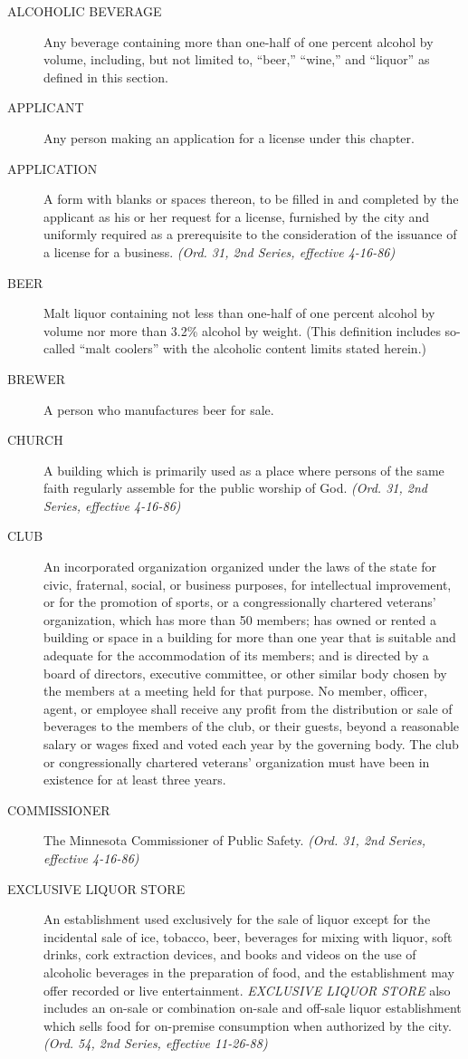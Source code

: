 \begin{description}
    \item[ALCOHOLIC BEVERAGE] Any beverage containing more than one-half of one percent alcohol by volume, including, but not limited to, “beer,” “wine,” and “liquor” as defined in this section.
    \item[APPLICANT] Any person making an application for a license under this chapter.
    \item[APPLICATION] A form with blanks or spaces thereon, to be filled in and completed by the applicant as his or her request for a license, furnished by the city and uniformly required as a prerequisite to the consideration of the issuance of a license for a business. \emph{(Ord. 31, 2nd Series, effective 4-16-86)}
    \item[BEER] Malt liquor containing not less than one-half of one percent alcohol by volume nor more than 3.2\% alcohol by weight. (This definition includes so-called “malt coolers” with the alcoholic content limits stated herein.)
    \item[BREWER] A person who manufactures beer for sale.
    \item[CHURCH] A building which is primarily used as a place where persons of the same faith regularly assemble for the public worship of God. \emph{(Ord. 31, 2nd Series, effective 4-16-86)}
    \item[CLUB] An incorporated organization organized under the laws of the state for civic, fraternal, social, or business purposes, for intellectual improvement, or for the promotion of sports, or a congressionally chartered veterans’ organization, which has more than 50 members; has owned or rented a building or space in a building for more than one year that is suitable and adequate for the accommodation of its members; and is directed by a board of directors, executive committee, or other similar body chosen by the members at a meeting held for that purpose.  No member, officer, agent, or employee shall receive any profit from the distribution or sale of beverages to the members of the club, or their guests, beyond a reasonable salary or wages fixed and voted each year by the governing body.  The club or congressionally chartered veterans’ organization must have been in existence for at least three years.
    \item[COMMISSIONER] The Minnesota Commissioner of Public Safety. \emph{(Ord. 31, 2nd Series, effective 4-16-86)}
    \item[EXCLUSIVE LIQUOR STORE] An establishment used exclusively for the sale of liquor except for the incidental sale of ice, tobacco, beer, beverages for mixing with liquor, soft drinks, cork extraction devices, and books and videos on the use of alcoholic beverages in the preparation of food, and the establishment may offer recorded or live entertainment.  \emph{EXCLUSIVE LIQUOR STORE} also includes an on-sale or combination on-sale and off-sale liquor establishment which sells food for on-premise consumption when authorized by the city. \emph{(Ord. 54, 2nd Series, effective 11-26-88)}

\end{description}
